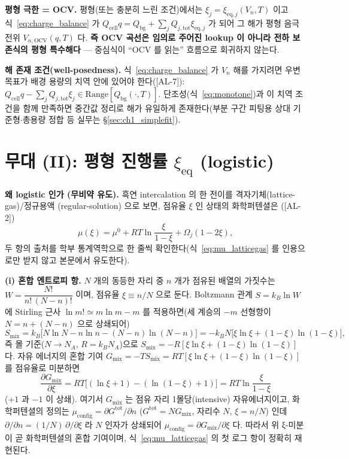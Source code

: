 \documentclass[11pt,a4paper]{article}
\newcommand{\eq}{\mathrm{eq}}
\newcommand{\bg}{\mathrm{bg}}
\newcommand{\cell}{\mathrm{cell}}
\newcommand{\OCV}{\mathrm{OCV}}
\newcommand{\tot}{\mathrm{tot}}
\newcommand{\AL}[1]{\textsf{[AL-#1]}}
\begin{document}
\textbf{평형 극한 = OCV.} 평형(또는 충분히 느린 조건)에서는 $\xi_j=\xi_{\eq,j}(V_n,T)$ 이고
식~\eqref{eq:charge_balance} 가 $Q_\cell q=Q_\bg+\sum_j Q_{j,\tot}\xi_{\eq,j}$ 가 되어 그 해가 평형 음극
전위 $V_{n,\OCV}(q,T)$ 다. \textbf{즉 OCV 곡선은 임의로 주어진 lookup 이 아니라 전하 보존식의 평형
특수해다} — 중심식이 ``OCV 를 읽는'' 흐름으로 회귀하지 않는다.

\textbf{해 존재 조건(well-posedness).} 식~\eqref{eq:charge_balance} 가 $V_n$ 해를 가지려면 우변 목표가 배경
용량의 치역 안에 있어야 한다(\AL{7}): $Q_\cell q-\sum_j Q_{j,\tot}\xi_j\in\mathrm{Range}[Q_\bg(\cdot,T)]$.
단조성(식~\eqref{eq:monotone})과 이 치역 조건을 함께 만족하면 중간값 정리로 해가 유일하게 존재한다(부분
구간 피팅용 상대 기준형$\cdot$총용량 정합 등 실무는 \S\ref{sec:ch1_simplefit}).

\section{무대 (II): 평형 진행률 $\xi_\eq$ (logistic)}\label{sec:eq}
\textbf{왜 logistic 인가 (무비약 유도).} 흑연 intercalation 의 한 전이를 격자기체(lattice-gas)/정규용액
(regular-solution) 으로 보면, 점유율 $\xi$ 인 상태의 화학퍼텐셜은 \cite{mckinnon1983,bazant2013}(\AL{2})
\begin{equation}
\mu(\xi)=\mu^0+RT\ln\frac{\xi}{1-\xi}+\Omega_j(1-2\xi),
\label{eq:mu_latticegas}
\end{equation}
두 항의 출처를 학부 통계역학으로 한 줄씩 확인한다(식~\eqref{eq:mu_latticegas} 를 인용으로만 받지 않고 본문에서 유도한다).

\textbf{(i) 혼합 엔트로피 항.} $N$ 개의 동등한 자리 중 $n$ 개가 점유된 배열의 가짓수는
$W=\dfrac{N!}{n!\,(N-n)!}$ 이며, 점유율 $\xi\equiv n/N$ 으로 둔다. Boltzmann 관계 $S=k_B\ln W$ 에 Stirling
근사 $\ln m!\simeq m\ln m-m$ 를 적용하면(세 계승의 $-m$ 선형항이 $N=n+(N-n)$ 으로 상쇄되어)
\begin{equation}
S_{\mathrm{mix}}=k_B\big[N\ln N-n\ln n-(N-n)\ln(N-n)\big]
=-k_B N\big[\xi\ln\xi+(1-\xi)\ln(1-\xi)\big],
\label{eq:smix}
\end{equation}
즉 몰 기준($N\!\to\!N_A$, $R=k_B N_A$)으로 $S_{\mathrm{mix}}=-R[\xi\ln\xi+(1-\xi)\ln(1-\xi)]$ 다. 자유
에너지의 혼합 기여 $G_{\mathrm{mix}}=-TS_{\mathrm{mix}}=RT[\xi\ln\xi+(1-\xi)\ln(1-\xi)]$ 를 점유율로 미분하면
\begin{equation}
\frac{\partial G_{\mathrm{mix}}}{\partial\xi}=RT\big[(\ln\xi+1)-(\ln(1-\xi)+1)\big]=RT\ln\frac{\xi}{1-\xi}
\label{eq:mu_mix}
\end{equation}
($+1$ 과 $-1$ 이 상쇄). 여기서 $G_{\mathrm{mix}}$ 는 점유 자리 1몰당(intensive) 자유에너지이고, 화학퍼텐셜의 정의는
$\mu_{\mathrm{config}}=\partial G^{\mathrm{tot}}/\partial n$ ($G^{\mathrm{tot}}=N G_{\mathrm{mix}}$, 자리수 $N$, $\xi=n/N$)
인데 $\partial/\partial n=(1/N)\,\partial/\partial\xi$ 라 $N$ 인자가 상쇄되어 $\mu_{\mathrm{config}}=\partial G_{\mathrm{mix}}/\partial\xi$
다. 따라서 위 ξ-미분이 곧 화학퍼텐셜의 혼합 기여이며, 식~\eqref{eq:mu_latticegas} 의 첫 로그 항이 정확히 재현된다.
\end{document}
